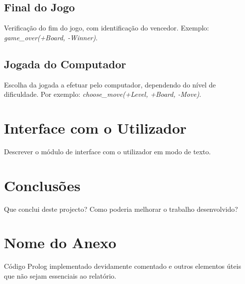 \documentclass[a4paper]{article}
\begin{document}
\newpage

\subsection{Final do Jogo} Verificação do fim do jogo, com identificação do vencedor. Exemplo: \textit{game\_over(+Board, -Winner)}.

\newpage

\subsection{Jogada do Computador} Escolha da jogada a efetuar pelo computador, dependendo do nível de dificuldade. Por exemplo: \textit{choose\_move(+Level, +Board, -Move)}.

\newpage

\section{Interface com o Utilizador}

Descrever o módulo de interface com o utilizador em modo de texto.

\newpage

\section{Conclusões}
Que conclui deste projecto? Como poderia melhorar o trabalho desenvolvido?


\clearpage
{}
\renewcommand\refname{Bibliografia}




\newpage
\appendix
\section{Nome do Anexo}
Código Prolog implementado devidamente comentado e outros elementos úteis que não sejam essenciais ao relatório.
\end{document}
